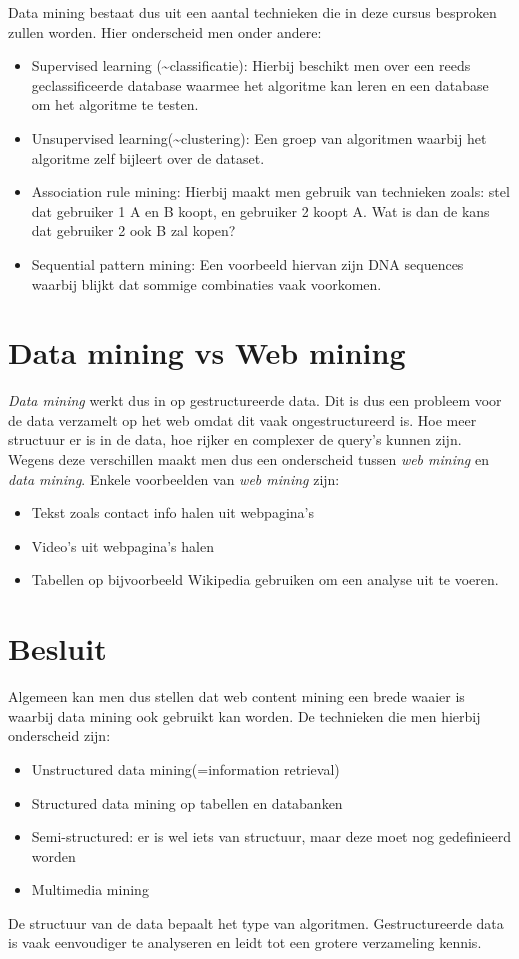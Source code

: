 Data mining bestaat dus uit een aantal technieken die in deze cursus besproken zullen worden. Hier onderscheid men onder andere:
\begin{itemize}
\item Supervised learning (\textasciitilde classificatie): Hierbij beschikt men over een reeds geclassificeerde database waarmee het algoritme kan leren en een database om het algoritme te testen.
\item Unsupervised learning(\textasciitilde clustering): Een groep van algoritmen waarbij het algoritme zelf bijleert over de dataset.
\item Association rule mining: Hierbij maakt men gebruik van technieken zoals: stel dat gebruiker 1 A en B koopt, en gebruiker 2 koopt A. Wat is dan de kans dat gebruiker 2 ook B zal kopen?
\item Sequential pattern mining: Een voorbeeld hiervan zijn DNA sequences waarbij blijkt dat sommige combinaties vaak voorkomen.
\end{itemize}
\section{Data mining vs Web mining}
\emph{Data mining} werkt dus in op gestructureerde data. Dit is dus een probleem voor de data verzamelt op het web omdat dit vaak ongestructureerd is. Hoe meer structuur er is in de data, hoe rijker en complexer de query's kunnen zijn. Wegens deze verschillen maakt men dus een onderscheid tussen \emph{web mining} en \emph{data mining}. Enkele voorbeelden van \emph{web mining} zijn:
\begin{itemize}
\item Tekst zoals contact info halen uit webpagina's
\item Video's uit webpagina's halen
\item Tabellen op bijvoorbeeld Wikipedia gebruiken om een analyse uit te voeren.
\end{itemize}
\newpage
\section{Besluit}
Algemeen kan men dus stellen dat web content mining een brede waaier is waarbij data mining ook gebruikt kan worden. De technieken die men hierbij onderscheid zijn:
\begin{itemize}
\item Unstructured data mining(=information retrieval)
\item Structured data mining op tabellen en databanken
\item Semi-structured: er is wel iets van structuur, maar deze moet nog gedefinieerd worden
\item Multimedia mining
\end{itemize}
De structuur van de data bepaalt het type van algoritmen. Gestructureerde data is vaak eenvoudiger te analyseren en leidt tot een grotere verzameling kennis.